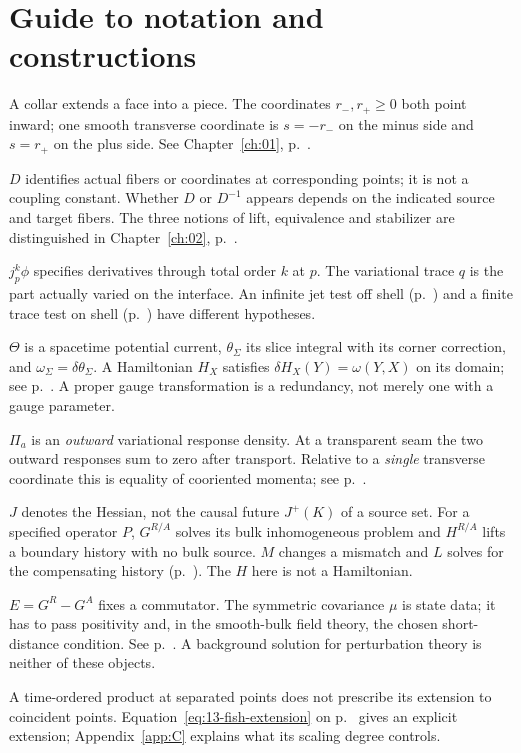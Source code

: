 \chapter*{Guide to notation and constructions}
\begin{description}[font=\normalfont\bfseries,leftmargin=1.2em]
\item[Collar and coorientation.] A collar extends a face into a piece. The coordinates $r_-,r_+\geq0$ both point inward; one smooth transverse coordinate is $s=-r_-$ on the minus side and $s=r_+$ on the plus side. See Chapter~\ref{ch:01}, p.~\pageref{ch:01}.
\item[Seam identification.] $D$ identifies actual fibers or coordinates at corresponding points; it is not a coupling constant. Whether $D$ or $D^{-1}$ appears depends on the indicated source and target fibers. The three notions of lift, equivalence and stabilizer are distinguished in Chapter~\ref{ch:02}, p.~\pageref{ch:02}.
\item[Jets and traces.] $j^k_p\phi$ specifies derivatives through total order $k$ at $p$. The variational trace $q$ is the part actually varied on the interface. An infinite jet test off shell (p.~\pageref{thm:off-shell-descent}) and a finite trace test on shell (p.~\pageref{thm:branch}) have different hypotheses.
\item[Potential, form, charge.] $\Theta$ is a spacetime potential current, $\theta_\Sigma$ its slice integral with its corner correction, and $\omega_\Sigma=\delta\theta_\Sigma$. A Hamiltonian $H_X$ satisfies $\delta H_X(Y)=\omega(Y,X)$ on its domain; see p.~\pageref{eq:05-noether}. A proper gauge transformation is a redundancy, not merely one with a gauge parameter.
\item[Trace and response.] $\Pi_a$ is an \emph{outward} variational response density. At a transparent seam the two outward responses sum to zero after transport. Relative to a \emph{single} transverse coordinate this is equality of cooriented momenta; see p.~\pageref{eq:summed-momentum}.
\item[Wave inverses.] $J$ denotes the Hessian, not the causal future $J^+(K)$ of a source set. For a specified operator $P$, $G^{R/A}$ solves its bulk inhomogeneous problem and $H^{R/A}$ lifts a boundary history with no bulk source. $M$ changes a mismatch and $L$ solves for the compensating history (p.~\pageref{prop:causal}). The $H$ here is not a Hamiltonian.
\item[Bracket and state.] $E=G^R-G^A$ fixes a commutator. The symmetric covariance $\mu$ is state data; it has to pass positivity and, in the smooth-bulk field theory, the chosen short-distance condition. See p.~\pageref{eq:11-covariance}. A background solution for perturbation theory is neither of these objects.
\item[Coincidence and contact terms.] A time-ordered product at separated points does not prescribe its extension to coincident points. Equation~\eqref{eq:13-fish-extension} on p.~\pageref{eq:13-fish-extension} gives an explicit extension; Appendix~\ref{app:C} explains what its scaling degree controls.\end{description}
